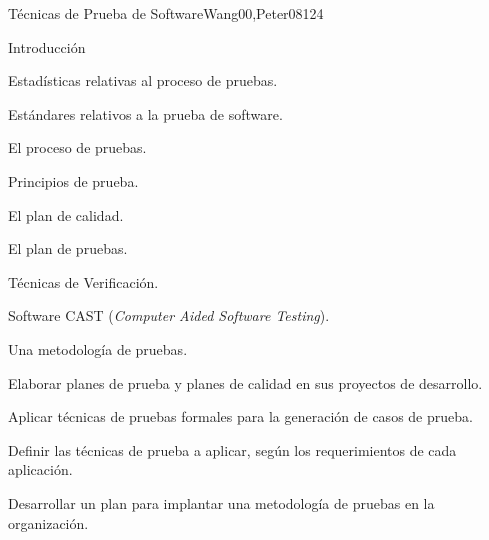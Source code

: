 \begin{syllabus}
\begin{unit}{Técnicas de Prueba de Software}{Wang00,Peter08}{12}{4}
\begin{topics}
      \item Introducción
      \item Estadísticas relativas al proceso de pruebas.
      \item Estándares relativos a la prueba de software.
      \item El proceso de pruebas.
      \begin{inparaenum}
         \item Principios de prueba.
         \item El plan de calidad.
         \item El plan de pruebas.
         \item Técnicas de Verificación.
      \end{inparaenum}
      \item Software CAST (\textit{Computer Aided Software Testing}).
      \item Una metodología de pruebas.
   \end{topics}

   \begin{learningoutcomes}
      \item Elaborar planes de prueba y planes de calidad en sus proyectos de desarrollo.
      \item Aplicar técnicas de pruebas formales para la generación de casos de prueba.
      \item Definir las técnicas de prueba a aplicar, según los requerimientos de cada aplicación.
      \item Desarrollar un plan para implantar una metodología de pruebas en la organización.
   \end{learningoutcomes}
\end{unit}



\begin{coursebibliography}
\end{coursebibliography}

\end{syllabus}

